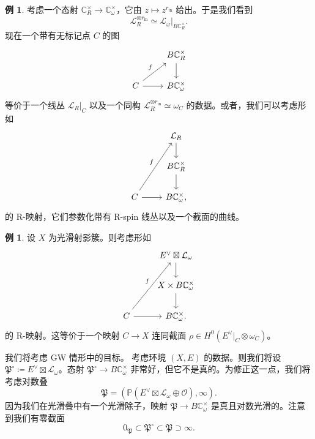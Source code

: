 \documentclass{amsart}
\theoremstyle{definition}
\newtheorem{exm}[thm]{例}
\theoremstyle{remark}
\theoremstyle{plain}
\theoremstyle{definition}
\theoremstyle{remark}
\newcommand{\C}{\mathbb{C}}
\renewcommand{\P}{\mathbb{P}}
\newcommand{\mc}[1]{\mathcal{#1}}
\newcommand{\mf}[1]{\mathfrak{#1}}
\newcommand{\mr}[1]{\mathrm{#1}}
\newcommand{\1}{\mathbf{1}}
\newcommand{\2}{\mathbf{2}}
\newcommand{\3}{\mathbf{3}}
\begin{document}
\begin{exm}
    考虑一个态射 \(\C^{\times}_R \to \C^{\times}_{\omega}\)，它由 \(z \mapsto z^{r_{\mr{in}}}\) 给出。于是我们看到
    \[ \mc{L}_R^{\otimes r_{\mr{in}}} \simeq \mc{L}_{\omega} |_{B \C_R^{\times}}. \]
    现在一个带有无标记点 \(C\) 的图
    \begin{equation*}
    \begin{tikzcd}
        & B \C_R^{\times} \ar{d} \\
        C \ar{ur}{f} \ar{r} & B \C_{\omega}^{\times}
    \end{tikzcd}
    \end{equation*}
    等价于一个线丛 \(\mc{L}_R|_C\) 以及一个同构 \(\mc{L}_R^{\otimes r_{\mr{in}}} \simeq \omega_C\) 的数据。或者，我们可以考虑形如
    \begin{equation*}
    \begin{tikzcd}
        & \mc{L}_R \ar{d} \\
        & B \C_R^{\times} \ar{d} \\
        C \ar{uur}{f} \ar{r} & B \C_{\omega}^{\times},
    \end{tikzcd}
    \end{equation*}
    的 R-映射，它们参数化带有 R-spin 线丛以及一个截面的曲线。
\end{exm}

\begin{exm}
    设 \(X\) 为光滑射影簇。则考虑形如
    \begin{equation*}
    \begin{tikzcd}
        & E^{\vee} \boxtimes \mc{L}_{\omega} \ar{d} \\
        & X \times B \C_{\omega}^{\times} \ar{d} \\
        C \ar{uur}{f} \ar{r} & B \C_{\omega}^{\times}.
    \end{tikzcd}
    \end{equation*}
    的 R-映射。这等价于一个映射 \(C \to X\) 连同截面 \(\rho \in H^0(E^{\vee}|_C \otimes \omega_C)\)。
\end{exm}

我们将考虑 GW 情形中的目标。
考虑环境 \((X, E)\) 的数据。则我们将设 \(\mf{P}^{\circ} \coloneqq E^{\vee} \boxtimes \mc{L}_{\omega}\)。态射 \(\mf{P}^{\circ} \to B \C_{\omega}^{\times}\) 非常好，但它不是真的。为修正这一点，我们将考虑对数叠
\[ \mf{P} = ( \P(E^{\vee} \boxtimes \mc{L}_{\omega} \oplus \mc{O}) , \infty). \]
因为我们在光滑叠中有一个光滑除子，映射 \(\mf{P} \to B \C_{\omega}^{\times}\) 是真且对数光滑的。注意到我们有零截面
\[ 0_{\mf{P}} \subset \mf{P}^{\circ} \subset \mf{P} \supset \infty. \]
\end{document}
